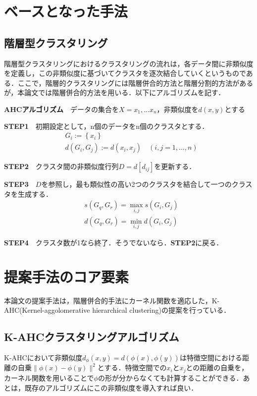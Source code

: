 \documentclass[10pt,onecolumn]{jsarticle}
\begin{document}
\section{ベースとなった手法}
\subsection{階層型クラスタリング}
階層型クラスタリングにおけるクラスタリングの流れは，各データ間に非類似度を定義し，この非類似度に基づいてクラスタを逐次結合していくというものである．ここで，階層的クラスタリングには階層併合的方法と階層分割的方法があるが，本論文では階層併合的方法を用いる．以下にアルゴリズムを記す．


\textbf{AHCアルゴリズム}　データの集合を$X = {x_1,...x_n}$，非類似度を$d(x,y)$とする

\textbf{STEP1}　初期設定として，n個のデータをn個のクラスタとする．
	\begin{align}
		&G_{i}:=\left\{x_{i}\right\} \\
		&d\left(G_{i}, G_{j}\right):=d\left(x_{i}, x_{j}\right) \quad(i, j=1, \ldots, n)
	\end{align}

\textbf{STEP2}　クラスタ間の非類似度行列$D = d[d_{ij}]$を更新する．

\textbf{STEP3}　$D$を参照し，最も類似性の高い2つのクラスタを結合して一つのクラスタを生成する．
		\begin{align}
		&s\left(G_{q}, G_{r}\right)=\max _{i, j} s\left(G_{i}, G_{j}\right) \\
		&d\left(G_{q}, G_{r}\right)=\min _{i, j} d\left(G_{i}, G_{j}\right)
		\end{align}

\textbf{STEP4}　クラスタ数が1なら終了．そうでないなら．\textbf{STEP2}に戻る．

\section{提案手法のコア要素}
本論文の提案手法は，階層併合的手法にカーネル関数を適応した，K-AHC(Kernel-aggolomerative hierarchical clustering)の提案を行っている．
\subsection{K-AHCクラスタリングアルゴリズム}
K-AHCにおいて非類似度$d_{\phi} (x,y) = d\left(\phi(x),\phi(y)\right)$は特徴空間における距離の自乗$\| \phi(x) - \phi(y)\|^2$とする．特徴空間での$x_i$と$x_j$との距離の自乗を，カーネル関数を用いることで$\phi$の形が分からなくても計算することができる．あとは，既存のアルゴリズムにこの非類似度を導入すれば良い．
\end{document}
